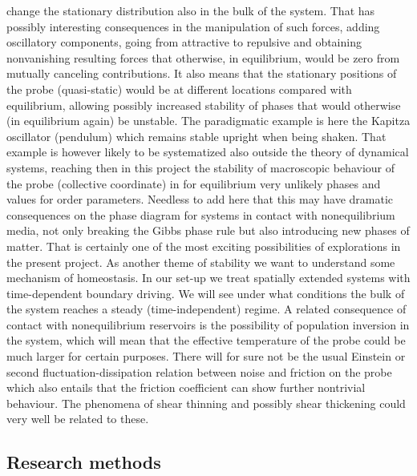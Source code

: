 change the stationary distribution also in the bulk of the system.  That has possibly
interesting consequences in the manipulation of such forces, adding oscillatory components,
going from attractive to repulsive and obtaining nonvanishing resulting forces that
otherwise, in equilibrium, would be zero from mutually canceling contributions.
%
It also means that the stationary positions of the probe (quasi-static) would be at
different locations compared with equilibrium, allowing possibly increased stability of
phases that would otherwise (in equilibrium again) be unstable.  The paradigmatic example is
here the Kapitza oscillator (pendulum) which remains stable upright when being shaken.  That
example is however likely to be systematized also outside the theory of dynamical systems,
reaching then in this project the stability of macroscopic behaviour of the probe
(collective coordinate) in for equilibrium very unlikely phases and values for order
parameters.  Needless to add here that this may have dramatic consequences on the phase
diagram for systems in contact with nonequilibrium media, not only breaking the Gibbs phase
rule but also introducing new phases of matter.  That is certainly one of the most exciting
possibilities of explorations in the present project. As another theme of stability we want
to understand some mechanism of homeostasis. In our set-up we treat spatially extended
systems with time-dependent boundary driving. We will see under what conditions the bulk of
the system reaches a steady (time-independent) regime. A related consequence of contact with
nonequilibrium reservoirs is the possibility of population inversion in the system, which
will mean that the effective temperature of the probe could be much larger for certain
purposes.  There will for sure not be the usual Einstein or second fluctuation-dissipation
relation between noise and friction on the probe which also entails that the friction
coefficient can show further nontrivial behaviour.  The phenomena of shear thinning and
possibly shear thickening could very well be related to these.
%


\subsection{Research methods}\label{sec:methods}

